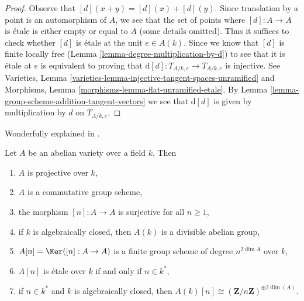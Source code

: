 \begin{proof}
Observe that $[d](x + y) = [d](x) + [d](y)$. Since translation by a
point is an automorphism of $A$, we see that the set of points where
$[d] : A \to A$ is \'etale is either empty or equal to $A$ (some details
omitted). Thus it suffices to check whether $[d]$ is \'etale at
the unit $e \in A(k)$. Since we know that $[d]$ is finite locally free
(Lemma \ref{lemma-degree-multiplication-by-d})
to see that it is \'etale at $e$ is equivalent to
proving that $\text{d}[d] : T_{A/k, e} \to T_{A/k, e}$ is injective. See
Varieties, Lemma \ref{varieties-lemma-injective-tangent-spaces-unramified} and
Morphisms, Lemma \ref{morphisms-lemma-flat-unramified-etale}.
By Lemma \ref{lemma-group-scheme-addition-tangent-vectors} we see that
$\text{d}[d]$ is given by multiplication by $d$ on $T_{A/k, e}$.
\end{proof}

\begin{proposition}
\label{proposition-review-abelian-varieties}
\begin{reference}
Wonderfully explained in \cite{AVar}.
\end{reference}
Let $A$ be an abelian variety over a field $k$. Then
\begin{enumerate}
\item $A$ is projective over $k$,
\item $A$ is a commutative group scheme,
\item the morphism $[n] : A \to A$ is surjective for all $n \geq 1$,
\item if $k$ is algebraically closed, then $A(k)$ is a divisible abelian group,
\item $A[n] = \Ker([n] : A \to A)$ is a finite group scheme of degree
$n^{2\dim A}$ over $k$,
\item $A[n]$ is \'etale over $k$ if and only if $n \in k^*$,
\item if $n \in k^*$ and $k$ is algebraically closed,
then $A(k)[n] \cong (\mathbf{Z}/n\mathbf{Z})^{\oplus 2\dim(A)}$.
\end{enumerate}
\end{proposition}

